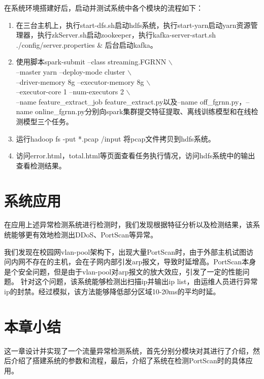 在系统环境搭建好后，启动并测试系统中各个模块的流程如下：
\begin{enumerate}
  \item 在三台主机上，执行start-dfs.sh启动hdfs系统，执行start-yarn启动yarn资源管理器，执行zkServer.sh启动zookeeper，执行kafka-server-start.sh ./config/server.properties \& 后台启动kafka。
  \item 使用脚本spark-submit --class streaming.FGRNN $\backslash$ \\
  --master yarn --deploy-mode cluster $\backslash$ \\
  --driver-memory 8g --executor-memory 8g $\backslash$ \\
  --executor-core 1 --num-executors 2 $\backslash$ \\
 --name feature\_extract\_job feature\_extract.py以及--name off\_fgrnn.py，--name online\_fgrnn.py分别向spark集群提交特征提取、离线训练模型和在线检测模型三个任务。
 \item 运行hadoop fs -put *.pcap /input 将pcap文件拷贝到hdfs系统。
 \item 访问error.html，total.html等页面查看任务执行情况，访问hdfs系统中的输出查看检测结果。
\end{enumerate}

\section{系统应用}
在应用上述异常检测系统进行检测时，我们发现根据特征分析以及检测结果，该系统能够更有效地检测出DDoS、PortScan等异常。

我们发现在校园网vlan-pool架构下，出现大量PortScan时，由于外部主机试图访问内网不存在的主机，会在子网内部引发arp报文，导致时延增高。PortScan本身是个安全问题，但是由于vlan-pool对arp报文的放大效应，引发了一定的性能问题。
针对这个问题，该系统能够检测出扫描ip并输出ip list，由运维人员进行异常ip的封禁。经过模拟，该方法能够降低部分区域10-20ms的平均时延。

\section{本章小结}
这一章设计并实现了一个流量异常检测系统，首先分别分模块对其进行了介绍，然后介绍了搭建系统的参数和流程，最后，介绍了系统在检测PortScan时的具体应用。
